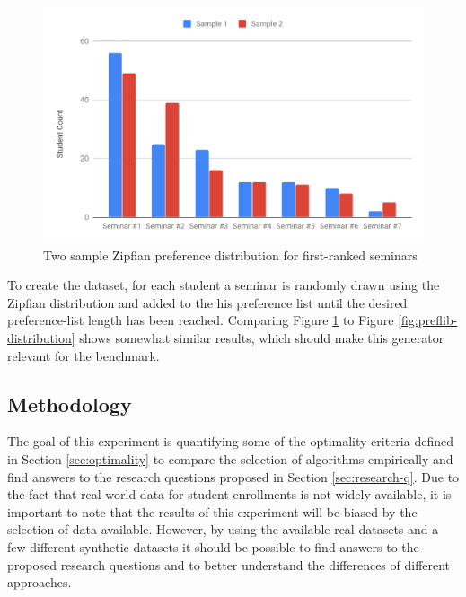   \begin{figure}[h!]
    \centering
    \includegraphics[width=0.8\linewidth]{assets/plots/zipfian-distr.pdf}
    \caption{Two sample Zipfian preference distribution for first-ranked seminars}
    \label{fig:zipfian-distribution}
\end{figure}

To create the dataset, for each student a seminar is randomly drawn using the Zipfian distribution and added to the his preference list until the desired preference-list length has been reached. Comparing Figure \ref{fig:zipfian-distribution} to Figure \ref{fig:preflib-distribution} shows somewhat similar results, which should make this generator relevant for the benchmark. 

\subsection{Methodology}
The goal of this experiment is quantifying some of the optimality criteria defined in Section \ref{sec:optimality} to compare the selection of algorithms empirically and find answers to the research questions proposed in Section \ref{sec:research-q}. Due to the fact that real-world data for student enrollments is not widely available, it is important to note that the results of this experiment will be biased by the selection of data available. However, by using the available real datasets and a few different synthetic datasets it should be possible to find answers to the proposed research questions and to better understand the differences of different approaches.


